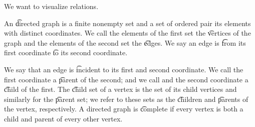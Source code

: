

We want to visualize relations.


An \t{directed graph} is a finite nonempty set and a set of ordered pair its elements with distinct coordinates.
We call the elements of the first set the \t{vertices} of the graph and the elements of the second set the \t{edges}.
We say an edge is \t{from} its first coordinate \t{to} its second coordinate.

We say that an edge is \t{incident} to its first and second coordinate.
We call the first coordinate a \t{parent} of the second; and we call and the second coordinate a \t{child} of the first.
The \t{child set} of a vertex is the set of its child vertices and similarly for the \t{parent set}; we refer to these sets as the \t{children} and \t{parents} of the vertex, respectively.
A directed graph is \t{complete} if every vertex is both a child and parent of every other vertex.

